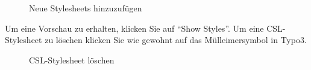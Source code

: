 \begin{figure}[h!]
 \centering
 \caption{Neue Stylesheets hinzuzufügen}
 \label{fig:neueStylesheets}
\end{figure}
Um eine Vorschau zu erhalten, klicken Sie auf \enquote{Show Styles}.\newline
Um eine CSL-Stylesheet zu löschen klicken Sie wie gewohnt auf das Mülleimersymbol in Typo3. 
\begin{figure}[h!]
 \centering
 \caption{CSL-Stylesheet löschen}
 \label{fig:cslLoeschen}
\end{figure}
